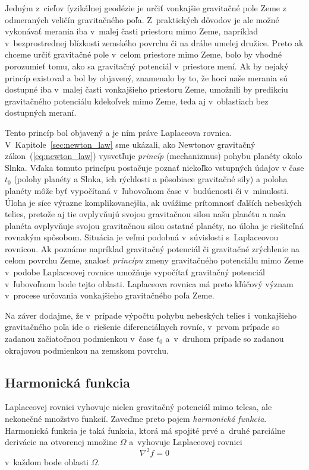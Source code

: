 \documentclass[a4paper,12pt]{book}
\begin{document}
Jedným z~cieľov fyzikálnej geodézie je určiť vonkajšie gravitačné pole Zeme 
z odmeraných veličín gravitačného poľa.  Z~praktických dôvodov je ale možné 
vykonávať merania iba v~malej časti priestoru mimo Zeme, napríklad 
v~bezprostrednej blízkosti zemského povrchu či na dráhe umelej družice.  Preto 
ak chceme určiť gravitačné pole v~celom priestore mimo Zeme, bolo by vhodné 
porozumieť tomu, ako sa gravitačný potenciál v~priestore mení.  Ak by nejaký 
princíp existoval a bol by objavený, znamenalo by to, že hoci naše merania sú 
dostupné iba v~malej časti vonkajšieho priestoru Zeme, umožnili by predikciu 
gravitačného potenciálu kdekoľvek mimo Zeme, teda aj v~oblastiach bez 
dostupných meraní.

Tento princíp bol objavený a je ním práve Laplaceova rovnica.  
V~Kapitole~\ref{sec:newton_law} sme ukázali, ako Newtonov gravitačný 
zákon~(\ref{eq:newton_law}) vysvetľuje \emph{princíp} (mechanizmus) pohybu 
planéty okolo Slnka.  Vďaka tomuto princípu postačuje poznať niekoľko vstupných 
údajov v čase $t_0$ (polohy planéty a Slnka, ich rýchlosti a pôsobiace 
gravitačné sily) a poloha planéty môže byť vypočítaná v~ľubovoľnom čase 
v~budúcnosti či v~minulosti.  Úloha je síce výrazne komplikovanejšia, ak 
uvážime prítomnosť ďalších nebeských telies, pretože aj tie ovplyvňujú svojou 
gravitačnou silou našu planétu a naša planéta ovplyvňuje svojou gravitačnou 
silou ostatné planéty, no úloha je riešiteľná rovnakým spôsobom.  Situácia je 
veľmi podobná v~súvislosti s~Laplaceovou rovnicou.  Ak poznáme napríklad 
gravitačný potenciál či gravitačné zrýchlenie na celom povrchu Zeme, znalosť 
\emph{princípu} zmeny gravitačného potenciálu mimo Zeme v~podobe Laplaceovej 
rovnice umožňuje vypočítať gravitačný potenciál v~ľubovoľnom bode tejto 
oblasti.  Laplaceova rovnica má preto kľúčový význam v~procese určovania 
vonkajšieho gravitačného poľa Zeme.

Na záver dodajme, že v~prípade výpočtu pohybu nebeských telies i~vonkajšieho 
gravitačného poľa ide o~riešenie diferenciálnych rovníc, v~prvom prípade so 
zadanou začiatočnou podmienkou v~čase $t_0$ a~v~druhom prípade so zadanou 
okrajovou podmienkou na zemskom povrchu.




\subsection{Harmonická funkcia}
\label{sec:harmonic_function}

Laplaceovej rovnici vyhovuje nielen gravitačný potenciál mimo telesa, ale
nekonečné množstvo funkcií.  Zaveďme preto pojem \emph{harmonická funkcia}.
Harmonická funkcia je taká funkcia, ktorá má spojité prvé a~druhé parciálne
derivácie na otvorenej množine $\Omega$ a~vyhovuje Laplaceovej rovnici
%
\begin{equation}
\nabla^2 f = 0
\end{equation}
%
v~každom bode oblasti $\Omega$.
\end{document}
